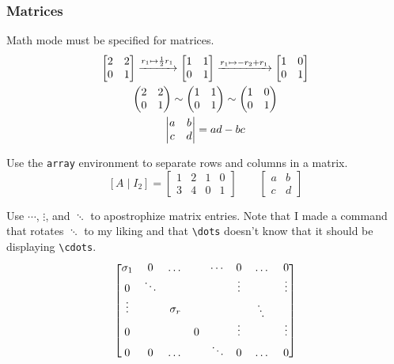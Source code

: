 \documentclass{article} 		%
\newcommand{\sddots}{\rotatebox{-30}{$\ddots$}} %
\begin{document}
\subsubsection{Matrices} \label{subsubsec:matrices}
Math mode must be specified for matrices. 
\begin{gather*}
	\begin{bmatrix}
		2 & 2 \\
		0 & 1
	\end{bmatrix}
	\xrightarrow{r_1 \mapsto \f{1}{2}r_1} %
	\begin{bmatrix}
		1 & 1 \\
		0 & 1
	\end{bmatrix}
	\xrightarrow{r_1 \mapsto -r_2 + r_1}
	\begin{bmatrix}
		1 & 0 \\
		0 & 1
	\end{bmatrix}
	\\
	\begin{pmatrix}
		2 & 2 \\
		0 & 1
	\end{pmatrix}
	\sim
	\begin{pmatrix}
		1 & 1 \\
		0 & 1
	\end{pmatrix}
	\sim
	\begin{pmatrix}
		1 & 0 \\
		0 & 1
	\end{pmatrix}
	\\
	\begin{vmatrix}
		a & b \\
		c & d
	\end{vmatrix}
	= ad-bc
\end{gather*}

Use the \texttt{array} environment to separate rows and columns in a matrix. 
\[
	[A \mid I_2] = 
	\left[
		\begin{array}{cc|cc}
			1 & 2 & 1 & 0 \\
			3 & 4 & 0 & 1
		\end{array}
	\right]
	\qquad
	\left[
		\begin{array}{c|c}
			a & b \\ \hline
			c & d
		\end{array}
	\right]
\]

Use $\cdots$, $\vdots$, and $\ddots$ to apostrophize matrix entries. Note that I made a command that rotates $\ddots$ to my liking and that \verb$\dots$ doesn't know that it should be displaying \verb$\cdots$. 
\[
	\begin{bmatrix}
		\sigma_1 & 0 & \dots & & \cdots & 0 & \dots & 0 \\
		0 & \ddots & & & & \vdots & & \vdots \\
		\vdots & & \sigma_r & & & & \sddots &  \\
		0 & & & 0 & & \vdots & & \vdots \\
		0 & 0 & \dots & & \ddots & 0 & \dots & 0 
	\end{bmatrix}
\]
\end{document}
